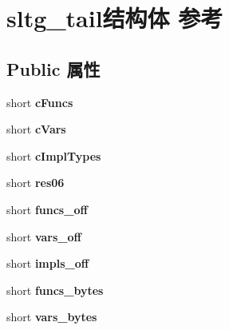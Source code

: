\hypertarget{structsltg__tail}{}\section{sltg\+\_\+tail结构体 参考}
\label{structsltg__tail}
\subsection*{Public 属性}
\begin{DoxyCompactItemize}
\item 
\mbox{\label{structsltg__tail_acdba08a21ae8eff59f214a350d27487b}} 
short {\bfseries c\+Funcs}
\item 
\mbox{\label{structsltg__tail_a08f7c3865a714f2ab8b7f3b25e303523}} 
short {\bfseries c\+Vars}
\item 
\mbox{\label{structsltg__tail_ab57cb32f23f0d0966679a69a340c68fe}} 
short {\bfseries c\+Impl\+Types}
\item 
\mbox{\label{structsltg__tail_acc8fab9d362b1d9b56ca0130527253e6}} 
short {\bfseries res06}
\item 
\mbox{\label{structsltg__tail_a013fc467b1438d6de8319b8e99d2ea57}} 
short {\bfseries funcs\+\_\+off}
\item 
\mbox{\label{structsltg__tail_aa1957ccade6b815e9846e52c1e18ee2c}} 
short {\bfseries vars\+\_\+off}
\item 
\mbox{\label{structsltg__tail_a1835ad34401facc54352912bdb5b24c4}} 
short {\bfseries impls\+\_\+off}
\item 
\mbox{\label{structsltg__tail_a9ed102afc64d724636acaeaec78cbc55}} 
short {\bfseries funcs\+\_\+bytes}
\item 
\mbox{\label{structsltg__tail_af51666b4bdc1b0a28d3525fd48f177ca}} 
short {\bfseries vars\+\_\+bytes}
\item 
\mbox{\label{structsltg__tail_a34a1064e8c5826f31293584c529debca}} 

\end{DoxyCompactItemize}
